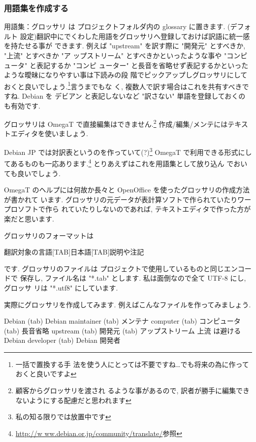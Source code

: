 \documentclass[mingoth,a4paper]{jsarticle}
\begin{document}
\subsubsection{用語集を作成する}

用語集：グロッサリ は プロジェクトフォルダ内の glossary に置きます. (デフォルト
設定)翻訳中にでくわした用語をグロッサリへ登録しておけば訳語に統一感を持たせる事が
できます. 例えば "upstream" を訳す際に "開発元" とすべきか, "上流" とすべきか "ア
ップストリーム" とすべきかといったような事や "コンピュータ" と表記するか "コンピ
ューター" と長音を省略せず表記するかといったような曖昧になりやすい事は下読みの段
階でピックアップしグロッサリにしておくと良いでしょう.\footnote{一括で置換する手
法を使う人にとっては不要ですね…でも将来の為に作っておくと良いですよ}言うまでもな
く, 複数人で訳す場合はこれを共有すべきですね. Debian を デビアン と表記しないなど
"訳さない" 単語を登録しておくのも有効です.

グロッサリは OmegaT で直接編集はできません.\footnote{顧客からグロッサリを渡され
るような事があるので, 訳者が勝手に編集できないようにする配慮だと思われます}
作成/編集/メンテにはテキストエディタを使いましょう.

Debian JP では対訳表というのを作っていて(?)\footnote{私の知る限りでは放置中です}
OmegaT で利用できる形式にしてあるものも一応あります.\footnote{\url{http://w
ww.debian.or.jp/community/translate/}参照} とりあえずはこれを用語集として放り込ん
でおいても良いでしょう.

OmegaT のヘルプには何故か長々と OpenOffice を使ったグロッサリの作成方法が書かれて
います. グロッサリの元データが表計算ソフトで作られていたりワープロソフトで作ら
れていたりしないのであれば, テキストエディタで作った方が楽だと思います.

グロッサリのフォーマットは
\begin{commandline}
翻訳対象の言語[TAB]日本語[TAB]説明や注記
\end{commandline}
です. グロッサリのファイルは プロジェクトで使用しているものと同じエンコードで
保存し, ファイル名は "*.tab" とします. 私は面倒なので全て UTF-8 にし, グロッサ
リは "*.utf8" にしています.

実際にグロッサリを作成してみます. 例えばこんなファイルを作ってみましょう.

\begin{commandline}
Debian (tab) Debian
maintainer (tab) メンテナ
computer (tab) コンピュータ (tab) 長音省略
upstream (tab) 開発元 (tab) アップストリーム 上流 は避ける
Debian developer (tab) Debian 開発者
\end{commandline}
\end{document}

